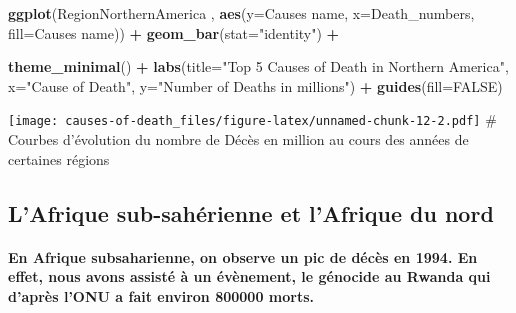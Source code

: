 \documentclass[
]{article}
\newenvironment{Shaded}{\begin{snugshade}}{\end{snugshade}}
\newcommand{\AttributeTok}[1]{\textcolor[rgb]{0.13,0.29,0.53}{#1}}
\newcommand{\ConstantTok}[1]{\textcolor[rgb]{0.56,0.35,0.01}{#1}}
\newcommand{\FunctionTok}[1]{\textcolor[rgb]{0.13,0.29,0.53}{\textbf{#1}}}
\newcommand{\NormalTok}[1]{#1}
\newcommand{\SpecialCharTok}[1]{\textcolor[rgb]{0.81,0.36,0.00}{\textbf{#1}}}
\newcommand{\StringTok}[1]{\textcolor[rgb]{0.31,0.60,0.02}{#1}}
\begin{document}
\begin{Shaded}
\begin{Highlighting}[]
\FunctionTok{ggplot}\NormalTok{(RegionNorthernAmerica , }\FunctionTok{aes}\NormalTok{(}\AttributeTok{y=}\StringTok{\textasciigrave{}}\AttributeTok{Causes name}\StringTok{\textasciigrave{}}\NormalTok{, }\AttributeTok{x=}\NormalTok{Death\_numbers, }\AttributeTok{fill=}\StringTok{\textasciigrave{}}\AttributeTok{Causes name}\StringTok{\textasciigrave{}}\NormalTok{)) }\SpecialCharTok{+}
  \FunctionTok{geom\_bar}\NormalTok{(}\AttributeTok{stat=}\StringTok{"identity"}\NormalTok{) }\SpecialCharTok{+}
 
  \FunctionTok{theme\_minimal}\NormalTok{() }\SpecialCharTok{+} 
  \FunctionTok{labs}\NormalTok{(}\AttributeTok{title=}\StringTok{"Top 5 Causes of Death in Northern America"}\NormalTok{,}
       \AttributeTok{x=}\StringTok{"Cause of Death"}\NormalTok{,}
       \AttributeTok{y=}\StringTok{"Number of Deaths in millions"}\NormalTok{) }\SpecialCharTok{+}
  \FunctionTok{guides}\NormalTok{(}\AttributeTok{fill=}\ConstantTok{FALSE}\NormalTok{)}
\end{Highlighting}
\end{Shaded}

\texttt{[image: causes-of-death\_files/figure-latex/unnamed-chunk-12-2.pdf]}
\# Courbes d'évolution du nombre de Décès en million au cours des années
de certaines régions

\hypertarget{lafrique-sub-sahuxe9rienne-et-lafrique-du-nord}{%
\subsection{L'Afrique sub-sahérienne et l'Afrique du
nord}\label{lafrique-sub-sahuxe9rienne-et-lafrique-du-nord}}

\hypertarget{en-afrique-subsaharienne-on-observe-un-pic-de-duxe9cuxe8s-en-1994.-en-effet-nous-avons-assistuxe9-uxe0-un-uxe9vuxe8nement-le-guxe9nocide-au-rwanda-qui-dapruxe8s-lonu-a-fait-environ-800000-morts.}{%
\paragraph{En Afrique subsaharienne, on observe un pic de décès en 1994.
En effet, nous avons assisté à un évènement, le génocide au Rwanda qui
d'après l'ONU a fait environ 800000
morts.}\label{en-afrique-subsaharienne-on-observe-un-pic-de-duxe9cuxe8s-en-1994.-en-effet-nous-avons-assistuxe9-uxe0-un-uxe9vuxe8nement-le-guxe9nocide-au-rwanda-qui-dapruxe8s-lonu-a-fait-environ-800000-morts.}}
\end{document}
